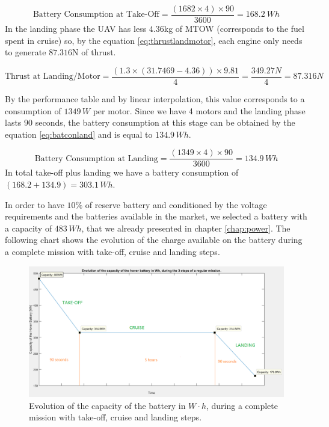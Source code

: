 \documentclass[english,fira]{ist-report}
\begin{document}
\begin{equation} \label{eq:batconsto}
    \text{Battery Consumption at Take-Off}=\frac{(1682\times4)\times 90}{3600}=168.2\ Wh
\end{equation}
In the landing phase the UAV has less $4.36$kg of MTOW (corresponds to the fuel spent in cruise) so, by the equation \ref{eq:thrustlandmotor}, each engine only needs to generate $87.316$N of thrust. 

\begin{equation} \label{eq:thrustlandmotor}
    \text{Thrust at Landing/Motor}=\frac{(1.3\times(31.7469-4.36))\times9.81}{4}=\frac{349.27N}{4}=87.316N
\end{equation}


By the performance table and by linear interpolation, this value corresponds to a consumption of $1349\,W$ per motor. Since we have 4 motors and the landing phase lasts $90$ seconds, the battery consumption at this stage can be obtained by the equation \ref{eq:batconland} and is equal to $134.9\,Wh$.

\begin{equation} \label{eq:batconland}
    \text{Battery Consumption at Landing}=\frac{(1349\times4)\times90}{3600}=134.9\,Wh
\end{equation}
In total take-off plus landing we have a battery consumption of $(168.2+134.9)=303.1\,Wh$.\par
In order to have $10\%$ of reserve battery and conditioned by the voltage requirements and the batteries available in the market, we selected a battery with a capacity of $483\,Wh$, that we already presented in chapter \ref{chap:power}. The following chart shows the evolution of the charge available on the battery during a complete mission with take-off, cruise and landing steps.

\begin{figure}[ht]
    \centering
    \includegraphics[width = \linewidth]{graphics/vtolperf/graph.png}
    \caption{Evolution of the capacity of the battery in $W\cdot h$, during a complete mission with take-off, cruise and landing steps.}
    \label{fig:vtolperf_chart}
\end{figure}
\end{document}
